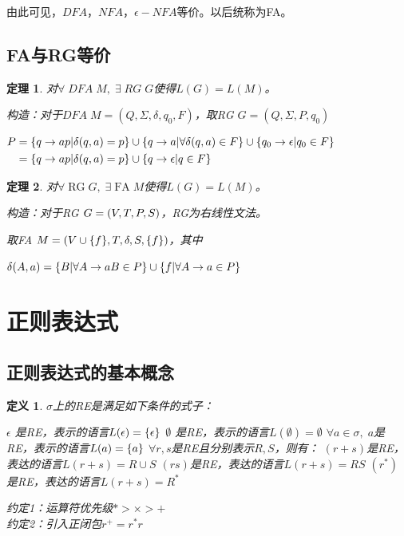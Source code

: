 \documentclass{ctexart}
\newtheorem{definition}{定义}[section]
\newtheorem{theorem}{定理}[section]
\DeclarePairedDelimiter{\set}{\{}{\}}
\DeclarePairedDelimiter{\paren}{(}{)}
\begin{document}
由此可见，$DFA$，$NFA$，$\epsilon-NFA$等价。以后统称为FA。

\subsection{FA与RG等价}

\begin{theorem}
    对$\forall\;DFA\;M,\;\exists\;RG\;G$使得$L(G) = L(M)$。

    构造：对于$DFA\; M=(Q,\Sigma,\delta,q_0, F)$，取RG
    $G=(Q, \Sigma, P, q_0)$

    $\begin{aligned}
        P &= \set*{q \to ap | \delta(q, a) = p} \cup 
    \set*{q \to a | \forall \delta(q, a) \in F} \cup
    \set*{q_0 \to \epsilon | q_0 \in F} \\
        & = \set*{q \to ap | \delta(q, a) = p} \cup 
        \set*{q \to \epsilon | q \in F} \\
    \end{aligned}$
\end{theorem}

\begin{theorem}
    对$\forall\;\text{RG}\;G,\;\exists\; \text{FA} \;M$使得$L(G) = L(M)$。

    构造：对于RG $G=\paren*{V, T, P, S}$，RG为右线性文法。

    取FA $M=(V \cup \set*{f},T,\delta,S, \set*{f})$，其中

    $\delta(A, a) = \set*{B | \forall A \to aB \in P} \cup 
    \set*{f | \forall A \to a \in P} 
    $
\end{theorem}

\section{正则表达式}

\subsection{正则表达式的基本概念}
\begin{definition}
    $\sigma$上的RE是满足如下条件的式子：
    \begin{outline}
        \1 $\epsilon$ 是RE，表示的语言$L(\epsilon) = \set*{\epsilon}$
        \1 $\emptyset$ 是RE，表示的语言$L(\emptyset) = \emptyset$
        \1 $\forall a \in \sigma,\; a$是RE，表示的语言$L(a) = \set{a}$
        \1 $\forall r, s$是RE且分别表示$R,S$，则有：
            \2 $(r+s)$是RE，表达的语言$L(r+s) = R \cup S$
            \2 $(rs)$是RE，表达的语言$L(r+s) = RS$
            \2 $(r^*)$是RE，表达的语言$L(r+s) = R^*$
    \end{outline}
    约定1：运算符优先级$* > \times > +$ \\
    约定2：引入正闭包$r^+ = r^*r$
\end{definition}
\end{document}
